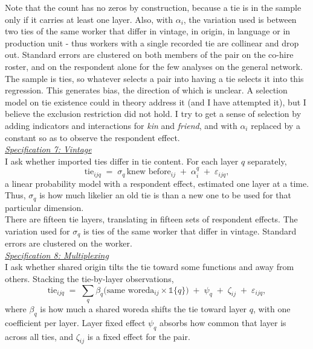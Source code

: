 \noindent Note that the count has no zeros by construction, because a tie is in the sample only if it carries at least one layer. Also, with $\alpha_i$, the variation used is between two ties of the same worker that differ in vintage, in origin, in language or in production unit - thus workers with a single recorded tie are collinear and drop out. Standard errors are clustered on both members of the pair on the co-hire roster, and on the respondent alone for the few analyses on the general network.\\

\noindent The sample is ties, so whatever selects a pair into having a tie selects it into this regression. This generates bias, the direction of which is unclear. A selection model on tie existence could in theory address it (and I have attempted it), but I believe the exclusion restriction did not hold. I try to get a sense of selection by adding indicators and interactions for \textit{kin} and \textit{friend}, and with $\alpha_i$ replaced by a constant so as to observe the respondent effect. \\

\noindent \underline{\textit{Specification 7: Vintage}} \\[0.4em]
I ask whether imported ties differ in tie content. For each layer $q$ separately,
\begin{equation}
\label{eq:strategy-vintage}
\text{tie}_{ijq} \;=\; \sigma_q \, \text{knew before}_{ij} \;+\; \alpha^{q}_{i} \;+\; \varepsilon_{ijq},
\end{equation}
a linear probability model with a respondent effect, estimated one layer at a time. Thus, $\sigma_q$ is how much likelier an old tie is than a new one to be used for that particular dimension. \\

\noindent There are fifteen tie layers, translating in fifteen sets of respondent effects. The variation used for $\sigma_q$ is ties of the same worker that differ in vintage. Standard errors are clustered on the worker. \\

\noindent \underline{\textit{Specification 8: Multiplexing}} \\[0.4em]
I ask whether shared origin tilts  the tie toward some functions and away from others. Stacking the tie-by-layer observations,
\begin{equation}
\label{eq:strategy-layer}
\text{tie}_{ijq} \;=\; \sum_{q} \beta_q \big( \text{same woreda}_{ij} \times \mathds{1}\{q\} \big) \;+\; \psi_{q} \;+\; \zeta_{ij} \;+\; \varepsilon_{ijq},
\end{equation}
where $\beta_q$ is how much a shared woreda shifts the tie toward layer $q$, with one coefficient per layer. Layer fixed effect $\psi_q$ absorbs how common that layer is across all ties, and $\zeta_{ij}$ is a fixed effect for the pair. \\

